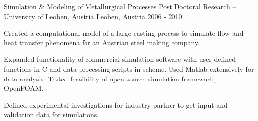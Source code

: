 \begin{cventries}
  \cventry
    {Simulation \& Modeling of Metallurgical Processes}
    {Post Doctoral Research – University of Leoben, Austria}
    {Leoben, Austria}
    {2006 - 2010}
    {
      \begin{cvitems}
        \item {Created a computational model of a large casting process to simulate flow and heat transfer phenomena for an Austrian steel making company.}
        \item {Expanded functionality of commercial simulation software with user defined functions in C and data processing scripts in scheme. Used Matlab extensively for data analysis. Tested feasibility of open source simulation framework, OpenFOAM.}
        \item {Defined experimental investigations for industry partner to get input and validation data for simulations.}
      \end{cvitems}
    }
    
\end{cventries}
